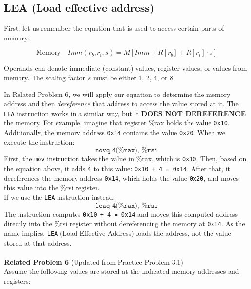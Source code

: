 \documentclass{article}
\begin{document}
\subsection{LEA (Load effective address)}
First, let us remember the equation that is used to access certain parts of memory:
\noindent 
\\
\begin{tcolorbox}[colframe=black, colback=white, boxrule=1pt]
    \begin{equation*}
        \text{Memory} \quad \textit{Imm}(r_b, r_i, s) = M[\textit{Imm} + R[r_b] + R[r_i] \cdot s]
    \end{equation*}
    \caption{Operands can denote immediate (constant) values, register values, or values from memory. The scaling factor \( s \) must be either 1, 2, 4, or 8.}
    \label{equation_mem}
\end{tcolorbox}
%
\noindent
%
In Related Problem 6, we will apply our equation to determine the memory address and then \textit{dereference} that address to access the value stored at it.
%
The \texttt{LEA} instruction works in a similar way, but it \textbf{DOES NOT DEREFERENCE} the memory.
For example, imagine that register \%rax holds the value \texttt{0x10}. Additionally, the memory address \texttt{0x14} contains the value \texttt{0x20}. When we execute the instruction:
%
\[
\texttt{movq 4(\%rax), \%rsi}
\]
%
First, the \texttt{mov} instruction takes the value in \%rax, which is \texttt{0x10}. Then, based on the equation above, it adds \texttt{4} to this value: \texttt{0x10 + 4 = 0x14}. After that, it dereferences the memory address \texttt{0x14}, which holds the value \texttt{0x20}, and moves this value into the \%rsi register. \\
%
If we use the \texttt{LEA} instruction instead:
%
\[
\texttt{leaq 4(\%rax), \%rsi}
\]
%
The instruction computes \texttt{0x10 + 4 = 0x14} and moves this computed address directly into the \%rsi register without dereferencing the memory at \texttt{0x14}. As the name implies, \texttt{LEA} (Load Effective Address) loads the address, not the value stored at that address. \\
\\
%
\noindent\textbf{Related Problem 6} (Updated from Practice Problem 3.1) \\
Assume the following values are stored at the indicated memory addresses and registers:
\end{document}
